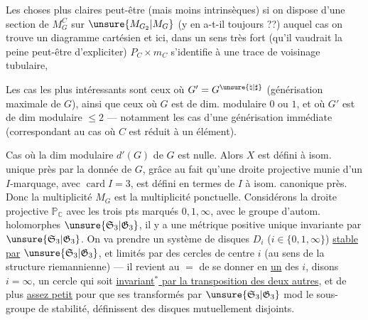 Les choses  plus claires peut-être (mais moins intrinsèques) si on dispose d'une section de $M_G^C$ sur $\unsure{M_{G_2}|M_G}$ (y en a-t-il toujours ??) auquel cas on trouve un diagramme cartésien
et ici, dans un sens très fort (qu'il vaudrait la peine peut-être d'expliciter) $P_C\times m_C$ s'identifie à une trace de voisinage tubulaire, 

Les cas les plus intéressants sont ceux où $G'=G^{\unsure{\natural|\sharp}}$ (générisation maximale de $G$), ainsi que ceux où $G$ est de dim. modulaire $0$ ou $1$,  et où $G'$ est de dim modulaire $\leq2$ --- notamment les cas d'une générisation immédiate (correspondant au cas où $C$ est réduit à un élément).

Cas où la dim modulaire $d'(G)$ de $G$ est nulle.
Alors $X$ est défini à isom. unique près par la donnée de $G$, grâce au fait qu'une droite projective munie d'un  $I$-marquage, avec $\operatorname{card}I=3$, est défini en termes de $I$ à isom. canonique près. Donc la multiplicité $M_G$ est la multiplicité ponctuelle. Considérons  la droite projective $\mathbb P_{\mathbb C}$ avec les
trois pts marqués $0,1,\infty$, avec le groupe d'autom. holomorphes $\unsure{\mathfrak S_3|\mathfrak G_3}$, il y a une métrique positive   unique invariante par $\unsure{\mathfrak S_3|\mathfrak G_3}$. On va prendre un système de disques $D_i$ ($i\in\{0,1,\infty\}$) \uline{stable par} $\unsure{\mathfrak S_3|\mathfrak G_3}$, et  limités par des cercles de centre $i$ (au sens de la structure riemannienne) --- il revient au $=$ de se donner en \uline{un} des $i$, disons $i=\infty$, un cercle  qui soit \uline{invariant$^*$ par la transposition des deux autres}, et de plus \uline{assez petit} pour que ses  transformés par $\unsure{\mathfrak S_3|\mathfrak G_3}$ mod le sous-groupe de stabilité, définissent des disques mutuellement disjoints.

